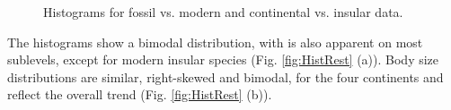 \begin{center}
	\begin{figure}[htbp]
		\caption[Fossil vs. modern, continental vs. insular.]{Histograms for fossil vs. modern and continental vs. insular data.}
		\label{fig:HistFMCI}
	\end{figure}
\end{center}

The histograms show a bimodal distribution, with is also apparent on most sublevels, except for modern insular species (Fig. \ref{fig:HistRest} (a)).
Body size distributions are similar, right-skewed and bimodal, for the four continents and reflect the overall trend (Fig. \ref{fig:HistRest} (b)).




